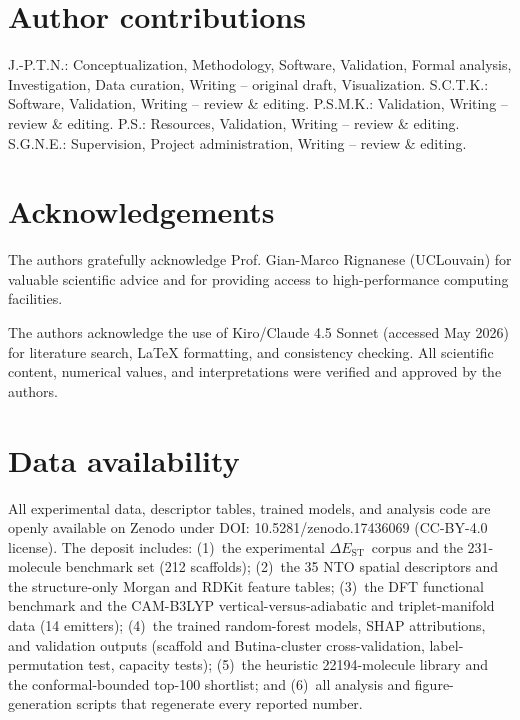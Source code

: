 \documentclass[twoside,onecolumn,9pt]{extarticle}
\newcommand{\deltaest}{$\Delta E_\text{ST}$}
\begin{document}
\section*{Author contributions}
J.-P.T.N.: Conceptualization, Methodology, Software, Validation, Formal analysis, Investigation, Data curation, Writing -- original draft, Visualization.
S.C.T.K.: Software, Validation, Writing -- review \& editing.
P.S.M.K.: Validation, Writing -- review \& editing.
P.S.: Resources, Validation, Writing -- review \& editing.
S.G.N.E.: Supervision, Project administration, Writing -- review \& editing.

\section*{Acknowledgements}
The authors gratefully acknowledge Prof. Gian-Marco Rignanese (UCLouvain) for valuable scientific advice and
for providing access to high-performance computing facilities.

The authors acknowledge the use of Kiro/Claude 4.5 Sonnet (accessed May 2026) for literature search, LaTeX formatting, and consistency checking. All 
scientific content, numerical values, and interpretations were verified and approved by the authors.

\section*{Data availability}
All experimental data, descriptor tables, trained models, and analysis code are
openly available on Zenodo under DOI: 10.5281/zenodo.17436069 (CC-BY-4.0 license).
The deposit includes: (1)~the experimental \deltaest\ corpus and the
\num{231}-molecule benchmark set (\num{212} scaffolds); (2)~the \num{35} NTO spatial
descriptors and the structure-only Morgan and RDKit feature tables; (3)~the DFT
functional benchmark and the CAM-B3LYP vertical-versus-adiabatic and triplet-manifold
data (\num{14} emitters); (4)~the trained random-forest models, SHAP attributions, and
validation outputs (scaffold and Butina-cluster cross-validation, label-permutation
test, capacity tests); (5)~the heuristic \num{22194}-molecule library and the
conformal-bounded top-\num{100} shortlist; and (6)~all analysis and figure-generation
scripts that regenerate every reported number.



\end{document}

